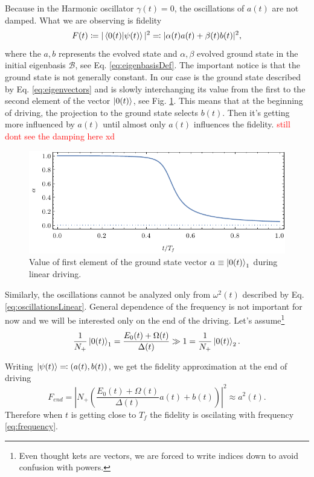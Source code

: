 Because in the Harmonic oscillator $\gamma(t)=0$, the oscillations of $a(t)$ are not damped. What we are observing is fidelity 
$$F(t)\coloneqq |\braket{0(t)|\psi(t)}|^2\eqqcolon |\alpha(t)a(t)+\beta(t)b(t)|^2, $$
where the $a,b$ represents the evolved state and $\alpha,\beta$ evolved ground state in the initial eigenbasis $\mathcal{B}$, see Eq. \ref{eq:eigenbasisDef}. The important notice is that the ground state is not generally constant. In our case is the ground state described by Eq. \ref{eq:eigenvectors} and is slowly interchanging its value from the first to the second element of the vector $\ket{0(t)}$, see Fig. \ref{fig:zeroState}. This means that at the beginning of driving, the projection to the ground state selects $b(t)$. Then it's getting more influenced by $a(t)$ until almost only $a(t)$ influences the fidelity. \textcolor{red}{still dont see the damping here xd}
\begin{figure}[H]
    \centering
    \includegraphics[scale=1.2]{../img/zeroState.pdf}
    \caption{Value of first element of the ground state vector $\alpha\equiv \ket{0(t)}_1$ during linear driving.}
    \label{fig:zeroState}
\end{figure}

Similarly, the oscillations cannot be analyzed only from $\omega^2(t)$ described by Eq. \ref{eq:oscillationsLinear}. General dependence of the frequency is not important for now and we will be interested only on the end of the driving. Let's assume\footnote{Even thought kets are vectors, we are forced to write indices down to avoid confusion with powers.}
\begin{equation}
   \frac{1}{N_+} \ket{0(t)}_1=\frac{E_0(t)+\Omega(t)}{\Delta(t)}\gg 1 =\frac{1}{N_+} \ket{0(t)}_2.
\end{equation}


Writing $\ket{\psi(t)}\eqqcolon (a(t),b(t))$, we get the fidelity approximation at the end of driving
\begin{equation}
    F_{end}= \left|N_+ \left(
        \frac{E_0(t)+\Omega(t)}{\Delta(t)} a(t)+b(t)
        \right)\right|^2 \approx a^2(t).
\end{equation}
Therefore when $t$ is getting close to $T_f$ the fidelity is oscilating with frequency \ref{eq:frequency}.




